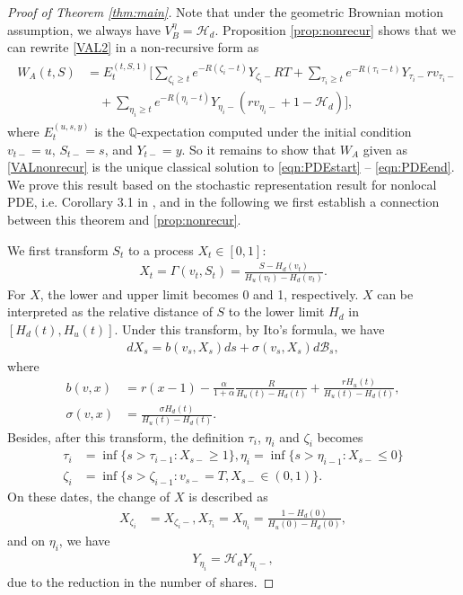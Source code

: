 \documentclass[final,pdftex]{ectaart}
\theoremstyle{plain}
\begin{document}
\begin{appendices}
\begin{proof}[Proof of Theorem \ref{thm:main}]
	Note that under the geometric Brownian motion assumption, we always have $V^\eta_B=\mathcal{H}_d$. Proposition \ref{prop:nonrecur} shows that we can rewrite \eqref{VAL2} in a non-recursive form as
	\begin{align*}
	\begin{split}
	W_A(t,S)&=E_t^{(t,S,1)}\Bigg[\sum_{\zeta_i\ge t}e^{-R(\zeta_i-t)}Y_{\zeta_i-}RT+\sum_{\tau_i\ge t}e^{-R(\tau_i-t)}Y_{\tau_i-}rv_{\tau_i-}\\
	&\quad+\sum_{\eta_i\ge t}e^{-R(\eta_i-t)}Y_{\eta_i-}(rv_{\eta_i-}+1-\mathcal{H}_d)\Bigg],
	\end{split}
	\end{align*}
	where $E^{(u,s,y)}_t$ is the $\mathbb{Q}$-expectation computed under the initial condition $v_{t-}=u$, $S_{t-}=s$, and $Y_{t-}=y$. So it remains to show that $W_A$ given as \eqref{VALnonrecur} is the unique classical solution to \eqref{eqn:PDEstart} -- \eqref{eqn:PDEend}. We prove this result based on the stochastic representation result for nonlocal PDE, i.e. Corollary 3.1 in \cite{dai_stochastic_2017}, and in the following we first establish a connection between this theorem and \eqref{prop:nonrecur}.

	We first transform $S_t$ to a process $X_t\in[0,1]$:
	\begin{align*}
		X_t=\Gamma(v_t,S_t)=\frac{S-H_d(v_t)}{H_u(v_t)-H_d(v_t)}.
	\end{align*}
	For $X$, the lower and upper limit becomes 0 and 1, respectively. $X$ can be interpreted as the relative distance of $S$ to the lower limit $H_d$ in $[H_d(t),H_u(t)]$. Under this transform, by Ito's formula, we have
	\begin{align*}
		dX_s=b(v_s,X_s)ds+\sigma(v_s,X_s)d\mathcal{B}_s,
	\end{align*}
	where
	\begin{align*}
		b(v,x)&=r(x-1)-\frac{\alpha}{1+\alpha}\frac{R}{H_u(t)-H_d(t)}+\frac{rH_u(t)}{H_u(t)-H_d(t)},\\
		\sigma(v,x)&=\frac{\sigma H_d(t)}{H_u(t)-H_d(t)}.
	\end{align*}
	Besides, after this transform, the definition $\tau_i$, $\eta_i$ and $\zeta_i$ becomes
	\begin{align*}
		\tau_i&=\inf\{s>\tau_{i-1}:X_{s-}\ge 1\},\eta_i=\inf\{s>\eta_{i-1}:X_{s-}\le 0\}\\
		\zeta_i&=\inf\{s>\zeta_{i-1}:v_{s-}=T,X_{s-}\in(0,1)\}.
	\end{align*}
	On these dates, the change of $X$ is described as
	\begin{align*}
		X_{\zeta_i}&=X_{\zeta_i-}, X_{\tau_i}=X_{\eta_i}=\frac{1-H_d(0)}{H_u(0)-H_d(0)},
	\end{align*}
	and on $\eta_i$, we have
	\begin{align*}
		Y_{\eta_i}=\mathcal{H}_d Y_{\eta_i-},
	\end{align*}
	due to the reduction in the number of shares.


\end{proof}
\end{appendices}
\end{document}
